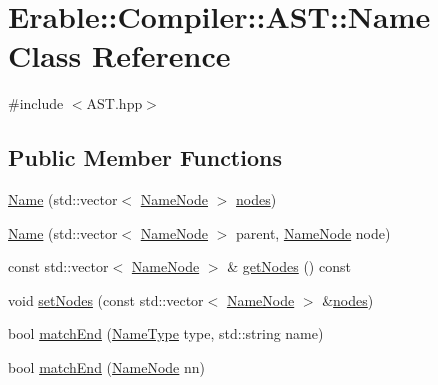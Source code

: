 \hypertarget{class_erable_1_1_compiler_1_1_a_s_t_1_1_name}{}\section{Erable\+::Compiler\+::A\+ST\+::Name Class Reference}
\label{class_erable_1_1_compiler_1_1_a_s_t_1_1_name}


{\ttfamily \#include $<$A\+S\+T.\+hpp$>$}

\subsection*{Public Member Functions}
\begin{DoxyCompactItemize}
\item 
\mbox{\hyperlink{class_erable_1_1_compiler_1_1_a_s_t_1_1_name_ac61ea71fc982ffd3acbdb05d3b707d0f}{Name}} (std\+::vector$<$ \mbox{\hyperlink{struct_erable_1_1_compiler_1_1_a_s_t_1_1_name_node}{Name\+Node}} $>$ \mbox{\hyperlink{class_erable_1_1_compiler_1_1_a_s_t_1_1_name_ad0f349d658f7d1300785b37fac094305}{nodes}})
\item 
\mbox{\hyperlink{class_erable_1_1_compiler_1_1_a_s_t_1_1_name_a8393e67a74d4875c0135685c65171ddb}{Name}} (std\+::vector$<$ \mbox{\hyperlink{struct_erable_1_1_compiler_1_1_a_s_t_1_1_name_node}{Name\+Node}} $>$ parent, \mbox{\hyperlink{struct_erable_1_1_compiler_1_1_a_s_t_1_1_name_node}{Name\+Node}} node)
\item 
const std\+::vector$<$ \mbox{\hyperlink{struct_erable_1_1_compiler_1_1_a_s_t_1_1_name_node}{Name\+Node}} $>$ \& \mbox{\hyperlink{class_erable_1_1_compiler_1_1_a_s_t_1_1_name_ac0a39c9cfbf8b14385038371c760272c}{get\+Nodes}} () const
\item 
void \mbox{\hyperlink{class_erable_1_1_compiler_1_1_a_s_t_1_1_name_aba0ba38b3634e3298525d9417dc57bb7}{set\+Nodes}} (const std\+::vector$<$ \mbox{\hyperlink{struct_erable_1_1_compiler_1_1_a_s_t_1_1_name_node}{Name\+Node}} $>$ \&\mbox{\hyperlink{class_erable_1_1_compiler_1_1_a_s_t_1_1_name_ad0f349d658f7d1300785b37fac094305}{nodes}})
\item 
bool \mbox{\hyperlink{class_erable_1_1_compiler_1_1_a_s_t_1_1_name_a6a2a3e33f0fcb4aab8f80f2f81befe91}{match\+End}} (\mbox{\hyperlink{namespace_erable_1_1_compiler_1_1_a_s_t_a9359137137aacfee07e935a0ae706a84}{Name\+Type}} type, std\+::string name)
\item 
bool \mbox{\hyperlink{class_erable_1_1_compiler_1_1_a_s_t_1_1_name_a0a0343de24f2ae22631dbb86daea1931}{match\+End}} (\mbox{\hyperlink{struct_erable_1_1_compiler_1_1_a_s_t_1_1_name_node}{Name\+Node}} nn)

\end{DoxyCompactItemize}
